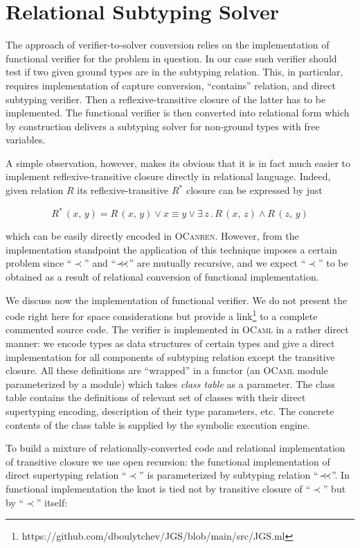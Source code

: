 \section{Relational Subtyping Solver}
\label{sec:solver}

The approach of verifier-to-solver conversion relies on the implementation of functional verifier for the problem in question. In our
case such verifier should test if two given ground types are in the subtyping relation. This, in particular, requires implementation
of capture conversion, ``contains'' relation, and direct subtyping verifier. Then a reflexive-transitive closure of the latter has to
be implemented. The functional verifier is then converted into relational form which by construction delivers a subtyping solver for
non-ground types with free variables.

A simple observation, however, makes its obvious that it is in fact much easier to implement reflexive-transitive closure directly
in relational language. Indeed, given relation $R$ its reflexive-transitive $R^*$ closure can be expressed by just

\[
R^*\,(x,\, y) = R\, (x,\, y)\vee x\equiv y\vee\exists\, z\,.\,R\,(x,\,z)\wedge R\,(z,\,y)
\]

which can be easily directly encoded in \textsc{OCanren}. However, from the implementation standpoint the application of this technique
imposes a certain problem since ``$\prec$'' and ``$\prec\mathrel{\mkern-5mu}\prec$'' are mutually recursive, and we expect ``$\prec$'' to be obtained as a
result of relational conversion of functional implementation.

We discuss now the implementation of functional verifier. We do not present the code right here for space considerations but provide
a link\footnote{https://github.com/dboulytchev/JGS/blob/main/src/JGS.ml} to a complete commented source code. The verifier is
implemented in \textsc{OCaml} in a rather direct manner: we encode types as data structures of certain types and give a
direct implementation for all components of subtyping relation except the transitive closure. All these definitions are ``wrapped'' in a
functor (an \textsc{OCaml} module parameterized by a module) which takes \emph{class table} as a parameter. The class table
contains the definitions of relevant set of classes with their direct supertyping encoding, description of their type parameters, etc.
The concrete contents of the class table is supplied by the symbolic execution engine.

To build a mixture of relationally-converted code and relational implementation of transitive closure we use open recursion: the functional
implementation of direct supertyping relation ``$\prec$'' is parameterized by subtyping relation  ``$\prec\mathrel{\mkern-5mu}\prec$''. In functional implementation
the knot is tied not by transitive closure of ``$\prec$'' but by ``$\prec$'' itself:

